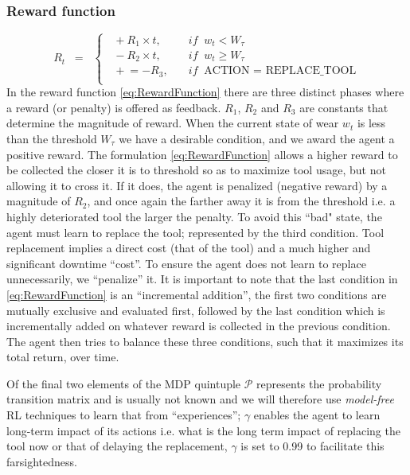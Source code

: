 \documentclass[a4paper, 12pt]{article}
\begin{document}
\subsubsection*{Reward function}
\begin{equation}
	R_t \;\;=\;\;
	\begin{cases}
		\;\;  +R_1 \times t, & \quad if \;\; w_t < W_\tau\\
		\;\;  -R_2 \times t, & \quad if \;\; w_t\ge W_\tau\\
		\;\; \mathrel{+}= -R_3, & \quad if \;\; \text{ACTION = REPLACE\_TOOL}\\
	\end{cases}
	\label{eq:RewardFunction}
\end{equation}
In the reward function \eqref{eq:RewardFunction} there are three distinct phases where a reward (or penalty) is offered as feedback. $R_1$, $R_2$ and $R_3$ are constants that determine the magnitude of reward. When the current state of wear $w_t$ is less than the threshold $W_\tau$ we have a desirable condition, and we award the agent a positive reward. The formulation \eqref{eq:RewardFunction} allows a higher reward to be collected the closer it is to threshold so as to maximize tool usage, but not allowing it to cross it. If it does, the agent is penalized (negative reward) by a magnitude of $R_2$, and once again the farther away it is from the threshold i.e. a highly deteriorated tool the larger the penalty. To avoid this ``bad" state, the agent must learn to replace the tool; represented by the third condition. Tool replacement implies a direct cost (that of the tool) and a much higher and significant downtime ``cost''. To ensure the agent does not learn to replace unnecessarily, we ``penalize'' it. It is important to note that the last condition in \eqref{eq:RewardFunction} is an ``incremental addition'', the first two conditions are mutually exclusive and evaluated first, followed by the last condition which is incrementally added on whatever reward is collected in the previous condition. The agent then tries to balance these three conditions, such that it maximizes its total return, over time.

Of the final two elements of the MDP quintuple $\mathcal{P}$ represents the probability transition matrix and is usually not known and we will therefore use \textit{model-free} RL techniques to learn that from ``experiences''; $\gamma$ enables the agent to learn long-term impact of its actions i.e. what is the long term impact of replacing the tool now or that of delaying the replacement, $\gamma$ is set to 0.99 to facilitate this farsightedness.
\end{document}
